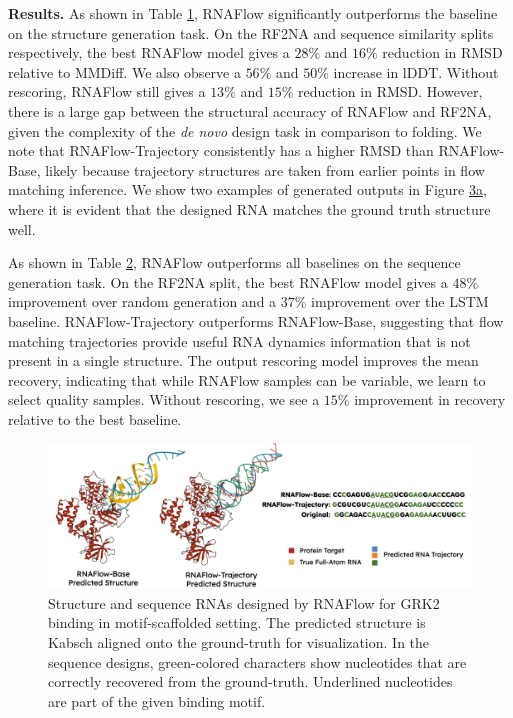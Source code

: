 \textbf{Results.} As shown in Table \hyperref[tab:1]{1}, RNAFlow significantly outperforms the baseline on the structure generation task. On the RF2NA and sequence similarity splits respectively, the best RNAFlow model gives a $28\%$ and $16\%$ reduction in RMSD relative to MMDiff. We also observe a $56\%$ and $50\%$ increase in lDDT. Without rescoring, RNAFlow still gives a $13\%$ and $15\%$ reduction in RMSD. However, there is a large gap between the structural accuracy of RNAFlow and RF2NA, given the complexity of the \textit{de novo} design task in comparison to folding. We note that RNAFlow-Trajectory consistently has a higher RMSD than RNAFlow-Base, likely because trajectory structures are taken from earlier points in flow matching inference. We show two examples of generated outputs in Figure \hyperref[fig:3]{3a}, where it is evident that the designed RNA matches the ground truth structure well.

As shown in Table \hyperref[tab:2]{2}, RNAFlow outperforms all baselines on the sequence generation task. On the RF2NA split, the best RNAFlow model gives a $48\%$ improvement over random generation and a $37\%$ improvement over the LSTM baseline. RNAFlow-Trajectory outperforms RNAFlow-Base, suggesting that flow matching trajectories provide useful RNA dynamics information that is not present in a single structure. The output rescoring model improves the mean recovery, indicating that while RNAFlow samples can be variable, we learn to select quality samples. Without rescoring, we see a $15\%$ improvement in recovery relative to the best baseline.

\begin{figure}[ht]
    \centering
    \includegraphics[width=2\columnwidth]{grk2.png}
    \caption{Structure and sequence RNAs designed by RNAFlow for GRK2 binding in motif-scaffolded setting. The predicted structure is Kabsch aligned onto the ground-truth for visualization. In the sequence designs, green-colored characters show nucleotides that are correctly recovered from the ground-truth. Underlined nucleotides are part of the given binding motif.}
    \label{fig:4}
\end{figure}

